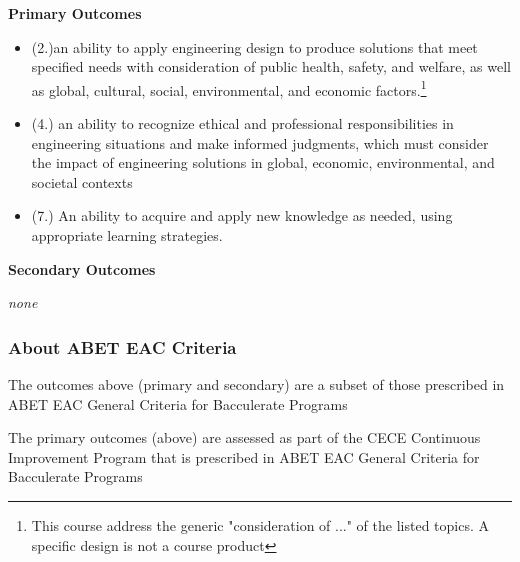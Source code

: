 \documentclass[12pt]{article}
\begin{document}
\textbf{Primary Outcomes}
\begin{itemize}
\item (2.)an ability to apply engineering design to produce solutions that meet specified needs
with consideration of public health, safety, and welfare, as well as global, cultural, social,
environmental, and economic factors.\footnote{This course address the generic "consideration of ..." of the listed topics. A specific design is not a course product}
\item (4.) an ability to recognize ethical and professional responsibilities in engineering
situations and make informed judgments, which must consider the impact of
engineering solutions in global, economic, environmental, and societal contexts
\item (7.) An ability to acquire and apply new knowledge as needed, using appropriate learning strategies.
\end{itemize}

\textbf{Secondary Outcomes}

\textsl{none}

\subsubsection*{{About ABET EAC Criteria}}

The outcomes above (primary and secondary) are a subset of those prescribed in ABET EAC General Criteria for Bacculerate Programs \citep{ABET2024}


The primary outcomes (above) are assessed as part of the CECE Continuous Improvement Program that is prescribed in ABET EAC General Criteria for Bacculerate Programs \citep{ABET2024}

\end{document}
